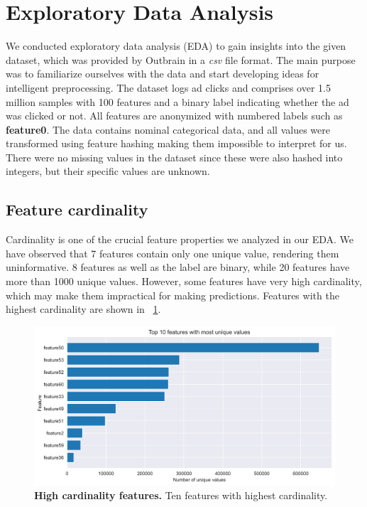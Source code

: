 \documentclass[fleqn,moreauthors,10pt]{ds_report}
\begin{document}

\section*{Exploratory Data Analysis}

We conducted exploratory data analysis (EDA) to gain insights into the given dataset, which was provided by Outbrain in a \textit{csv} file format. The main purpose was to familiarize ourselves with the data and start developing ideas for intelligent preprocessing. The dataset logs ad clicks and comprises over 1.5 million samples with 100 features and a binary label indicating whether the ad was clicked or not. All features are anonymized with numbered labels such as \textbf{feature0}. The data contains nominal categorical data, and all values were transformed using feature hashing making them impossible to interpret for us. There were no missing values in the dataset since these were also hashed into integers, but their specific values are unknown. 

\subsection*{Feature cardinality}
Cardinality is one of the crucial feature properties we analyzed in our EDA. We have observed that 7 features contain only one unique value, rendering them uninformative. 8 features as well as the label are binary, while 20 features have more than 1000 unique values. However, some features have very high cardinality, which may make them impractical for making predictions. Features with the highest cardinality are shown in \figurename~\ref{fig:cardinality}. 


\begin{figure}[ht]\centering 
	\includegraphics[width=\linewidth]{img/top10_features_unique_values.png}
	\caption{\textbf{High cardinality features.} Ten features with highest cardinality.}
	\label{fig:cardinality}
\end{figure}
\end{document}
